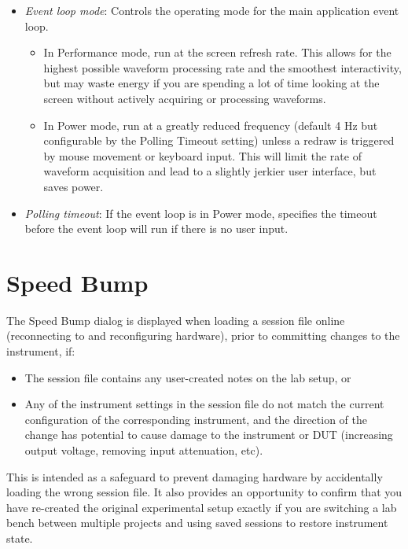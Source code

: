 \begin{itemize}
\item \emph{Event loop mode}: Controls the operating mode for the main application event loop.
\begin{itemize}
\item In Performance mode, run at the screen refresh rate. This allows for the highest possible waveform processing rate
and the smoothest interactivity, but may waste energy if you are spending a lot of time looking at the screen without
actively acquiring or processing waveforms.
\item In Power mode, run at a greatly reduced frequency (default 4 Hz but configurable by the Polling Timeout setting)
unless a redraw is triggered by mouse movement or keyboard input. This will limit the rate of waveform acquisition and
lead to a slightly jerkier user interface, but saves power.
\end{itemize}
\item \emph{Polling timeout}: If the event loop is in Power mode, specifies the timeout before the event loop will run
if there is no user input.
\end{itemize}


\section{Speed Bump}
\label{dlg:speedbump}

The Speed Bump dialog is displayed when loading a session file online (reconnecting to and reconfiguring hardware),
prior to committing changes to the instrument, if:

\begin{itemize}
\item The session file contains any user-created notes on the lab setup, or
\item Any of the instrument settings in the session file do not match the current configuration of the corresponding
instrument, and the direction of the change has potential to cause damage to the instrument or DUT (increasing output
voltage, removing input attenuation, etc).
\end{itemize}

This is intended as a safeguard to prevent damaging hardware by accidentally loading the wrong session file. It also
provides an opportunity to confirm that you have re-created the original experimental setup exactly if you are
switching a lab bench between multiple projects and using saved sessions to restore instrument state.

